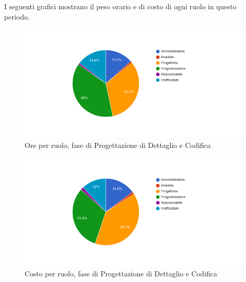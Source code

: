 I seguenti grafici mostrano il peso orario e di costo di ogni ruolo in questo periodo.

\begin{figure}[H]
  \begin{center}
    \includegraphics[width=15cm]{res/img/prospettoEconomico/orePerRuoloProgettazioneDettaglioCodifica.png}
  \caption{Ore per ruolo, fase di Progettazione di Dettaglio e Codifica}
  \end{center} 
\end{figure}  

\begin{figure}[H]
  \begin{center}
    \includegraphics[width=15cm]{res/img/prospettoEconomico/costoPerRuoloProgettazioneDettaglioCodifica.png}
  \caption{Costo per ruolo, fase di Progettazione di Dettaglio e Codifica}
  \end{center} 
\end{figure}  


